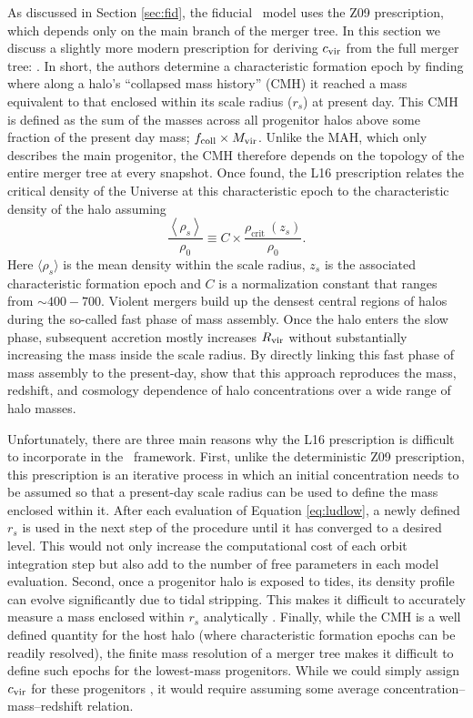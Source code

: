 \documentclass[twocolumn,apj,numberedappendix,twocolappendix,iop]{openjournal}
\begin{document}
As discussed in Section \ref{sec:fid}, the fiducial \SatGen\ model uses the Z09 prescription, which depends only on the main branch of the merger tree. In this section we discuss a slightly more modern prescription for deriving $c_{\rm vir}$ from the full merger tree: \cite{Ludlow.etal.16}. In short, the authors determine a characteristic formation epoch by finding where along a halo's ``collapsed mass history'' (CMH) it reached a mass equivalent to that enclosed within its scale radius ($r_s$) at present day. This CMH is defined as the sum of the masses across all progenitor halos above some fraction of the present day mass; $f_{\rm coll} \times M_{\rm vir}$. Unlike the MAH, which only describes the main progenitor, the CMH therefore depends on the topology of the entire merger tree at every snapshot. Once found, the L16 prescription relates the critical density of the Universe at this characteristic epoch to the characteristic density of the halo assuming
%
\begin{equation}
    \frac{\left\langle\rho_{s}\right\rangle}{\rho_0} \equiv C \times \frac{\rho_{\text {crit }}\left(z_{s}\right)}{\rho_0}.
    \label{eq:ludlow}
\end{equation}
%
Here $\langle \rho_{s} \rangle$ is the mean density within the scale radius, $z_{s}$ is the associated characteristic formation epoch and $C$ is a normalization constant that ranges from $\sim 400-700$. Violent mergers build up the densest central regions of halos during the so-called fast phase of mass assembly. Once the halo enters the slow phase, subsequent accretion mostly increases $R_{\rm vir}$ without substantially increasing the mass inside the scale radius. By directly linking this fast phase of mass assembly to the present-day, \cite{Ludlow.etal.16} show that this approach reproduces the mass, redshift, and cosmology dependence of halo concentrations over a wide range of halo masses. 

Unfortunately, there are three main reasons why the L16 prescription is difficult to incorporate in the \SatGen\ framework. First, unlike the deterministic Z09 prescription, this prescription is an iterative process in which an initial concentration needs to be assumed so that a present-day scale radius can be used to define the mass enclosed within it. After each evaluation of Equation \ref{eq:ludlow}, a newly defined $r_s$ is used in the next step of the procedure until it has converged to a desired level. This would not only increase the computational cost of each orbit integration step but also add to the number of free parameters in each model evaluation. Second, once a progenitor halo is exposed to tides, its density profile can evolve significantly due to tidal stripping. This makes it difficult to accurately measure a mass enclosed within $r_s$ analytically \citep{Green.vdBosch.19, Chiang.etal.24}. Finally, while the CMH is a well defined quantity for the host halo (where characteristic formation epochs can be readily resolved), the finite mass resolution of a merger tree makes it difficult to define such epochs for the lowest-mass progenitors. While we could simply assign $c_{\rm vir}$ for these progenitors \citep[e.g.][]{Benson.etal.19}, it would require assuming some average concentration–mass–redshift relation.
\end{document}
